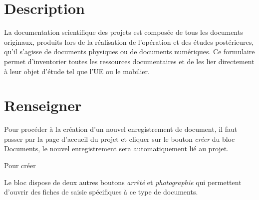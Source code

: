 \documentclass[letterpaper,10pt,french]{sphinxmanual}
\begin{document}
\section{Description}
\label{manuel/formulaire_documentation:description}
La documentation scientifique des projets est composée de tous les documents originaux, produits lors de la réalisation de l’opération et des études postérieures, qu’il s’agisse de documents physiques ou de documents numériques. Ce formulaire permet d'inventorier toutes les ressources documentaires et de les lier directement à leur objet d'étude tel que l'UE ou le mobilier.
\begin{figure}[htbp]
\centering

\end{figure}


\section{Renseigner}
\label{manuel/formulaire_documentation:renseigner}
Pour procéder à la création d'un nouvel enregistrement de document, il faut passer par la page d'accueil du projet et cliquer sur le bouton \emph{créer} du bloc Documents, le nouvel enregistrement sera automatiquement lié au projet.

Pour créer

Le bloc dispose de deux autres boutons \emph{arrêté} et \emph{photographie} qui permettent d'ouvrir des fiches de saisie spécifiques à ce type de documents.
\end{document}
